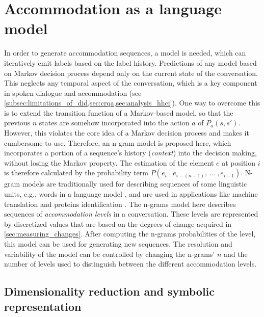 \section{Accommodation as a language model} %
\label{sec:accommodation_as_a_lm}

In order to generate accommodation sequences, a model is needed, which can iteratively emit labels based on the label history. 
Predictions of any model based on Markov decision process \citep{Bellman1957markovian} depend only on the current state of the conversation.
This neglects any temporal aspect of the conversation, which is a key component in spoken dialogue and accommodation (see \cref{subsec:limitations_of_did,sec:crqa,sec:analysis_hhci}).
One way to overcome this is to extend the transition function of a Markov-based model, so that the previous $n$ states are somehow incorporated into the action $a$ of $P_a(s, s')$.
However, this violates the core idea of a Markov decision process and makes it cumbersome to use.
Therefore, an n-gram model is proposed here, which incorporates a portion of a sequence's history (\emph{context}) into the decision making, without losing the Markov property.
The estimation of the element $e$ at position $i$ is therefore calculated by the probability term $P(e_i \mid e_{i-(n-1)},\ \ldots\ , e_{i-1})$.
N-gram models are traditionally used for describing sequences of some linguistic units, e.g., words in a language model \citep[e.g.,][]{Niesler1996variable}, and are used in applications like machine translation \citep{Marino2006ngram} and proteins identification \citep{Xu2015identification}.
The n-grams model here describes sequences of \emph{accommodation levels} in a conversation.
These levels are represented by discretized values that are based on the degrees of change acquired in \cref{sec:measuring_changes}.
After computing the n-grams probabilities of the level, this model can be used for generating new sequences.
The resolution and variability of the model can be controlled by changing the n-grams' $n$ and the number of levels used to distinguish between the different accommodation levels.

\subsection{Dimensionality reduction and symbolic representation}
\label{subsec:dim_reduction_and_symbolic_rep}

